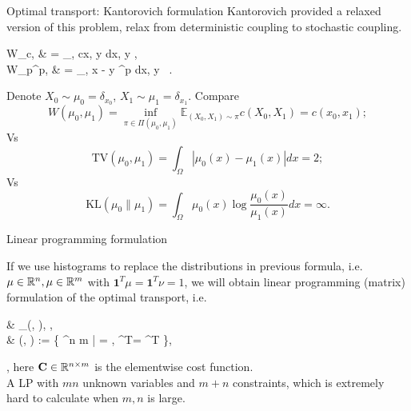 \documentclass{beamer}
\begin{document}
\begin{frame}{Optimal transport: Kantorovich formulation}
Kantorovich provided a relaxed version of this problem, relax from deterministic coupling to stochastic coupling. 
\bequn
		\begin{aligned}
			W_c\lp \mu, \nu \rp & = \inf_{\pi \in \prod\lp \mu, \nu \rp} \int c\lp x, y \rp d\pi\lp x, y \rp,		\\
			W_p^p\lp \mu, \nu \rp & = \inf_{\pi \in \prod\lp \mu, \nu \rp} \int \lv x - y \rv^p d\pi\lp x, y \rp \ .
		\end{aligned}
	\eequn
Denote $X_0\sim \mu_0=\delta_{x_0}$, $X_1\sim \mu_1=\delta_{x_1}$. Compare
$$W(\mu_0,\mu_1)=\inf_{\pi\in\Pi(\mu_0, \mu_1)}\mathbb{E}_{(X_0, X_1)\sim\pi} c(X_0, X_1)=c(x_0,x_1);$$
Vs
$$\textrm{TV}(\mu_0,\mu_1)=\int_{\Omega}|\mu_0(x)-\mu_1(x)|dx=2;$$
Vs 
$$\textrm{KL}(\mu_0\|\mu_1)=\int_\Omega\mu_0(x)\log\frac{\mu_0(x)}{\mu_1(x)}dx=\infty.$$
\end{frame}


\begin{frame}{Linear programming formulation}
\par
	If we use histograms to replace the distributions in previous formula, i.e. $\mu \in \mathbb{R}^n, \mu \in \mathbb{R}^m$ with $\mathbf{1}^T\mu = \mathbf{1}^T\nu = 1$, we will obtain linear programming (matrix) formulation of the optimal transport, i.e.
	\bequ
		\begin{aligned}
			& \min_{\mfP \in \prod(\mu, \nu)}\la \mfC, \mfP \ra,			\\
			& \prod(\mu, \nu) := \left\{ \mfP \in \mbR^{n \times m} | \mu = \mfP\mathbf{1}, ^T\mfP = \nu^T \right\},			\\
		\end{aligned},
	\eequ
	here $\mathbf{C} \in \mathbb{R}^{n \times m}$ is the elementwise cost function. \\
	A LP with $mn$ unknown variables and $m + n$ constraints, which is extremely hard to calculate when $m, n$ is large.
\end{frame}
\end{document}
